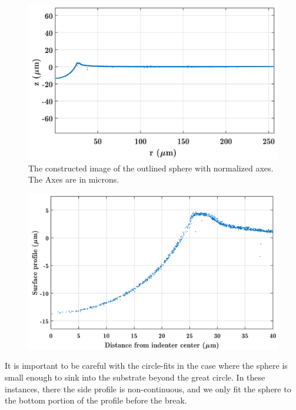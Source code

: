 \begin{figure}[h!]
	\centering
	\includegraphics[width=\linewidth]{Chapters/Figures/sphere011_ia/side_collapsed}
	\caption[Collapsed Side Profile]{The constructed image of the outlined sphere with normalized axes. The Axes are in microns.}
	\label{fig:sidecollapsed}
\end{figure}
\begin{figure}[h!]
	\centering
	\includegraphics[width=.9\linewidth]{Chapters/Figures/sphere011_ia/side_collapsed_zoomed}
	\caption[Collapsed Side Profile: Zoomed]{}
	\label{fig:sidecollapsedzoomed}
\end{figure}

It is important to be careful with the circle-fits in the case where the sphere is small enough to sink into the substrate beyond the great circle. In these instances, there the side profile is non-continuous, and we only fit the sphere to the bottom portion of the profile before the break.  



